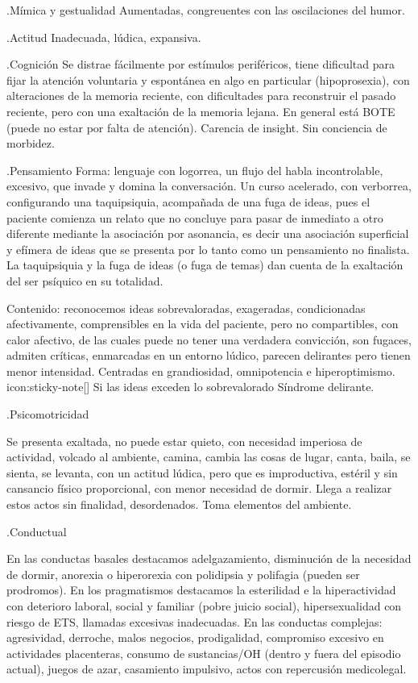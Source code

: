 .Mímica y gestualidad
Aumentadas, congreuentes con las oscilaciones del humor.

.Actitud
Inadecuada, lúdica, expansiva.

.Cognición
Se distrae fácilmente por estímulos periféricos, tiene dificultad para fijar la atención voluntaria y espontánea en algo en particular (hipoprosexia), con alteraciones de la memoria reciente, con dificultades para reconstruir el pasado reciente, pero con una exaltación de la memoria lejana. En general está BOTE (puede no estar por falta de atención). Carencia de insight. Sin conciencia de morbidez.

.Pensamiento
Forma: lenguaje con logorrea, un flujo del habla incontrolable, excesivo, que invade y domina la conversación. Un curso acelerado, con verborrea, configurando una taquipsiquia, acompañada de una fuga de ideas, pues el paciente comienza un relato que no concluye para pasar de inmediato a otro diferente mediante la asociación por asonancia, es decir una asociación superficial y efímera de ideas que se presenta por lo tanto como un pensamiento no finalista. La taquipsiquia y la fuga de ideas (o fuga de temas) dan cuenta de la exaltación del ser psíquico en su totalidad.

Contenido: reconocemos ideas sobrevaloradas, exageradas, condicionadas afectivamente, comprensibles en la vida del paciente, pero no compartibles, con calor afectivo, de las cuales puede no tener una verdadera convicción, son fugaces, admiten críticas, enmarcadas en un entorno lúdico, parecen delirantes pero tienen menor intensidad. Centradas en grandiosidad, omnipotencia e hiperoptimismo. icon:sticky-note[] Si las ideas exceden lo sobrevalorado \faArrowCircleRight Síndrome delirante.

.Psicomotricidad

Se presenta exaltada, no puede estar quieto, con necesidad imperiosa de actividad, volcado al ambiente, camina, cambia las cosas de lugar, canta, baila, se sienta, se levanta, con un actitud lúdica, pero que es improductiva, estéril y sin cansancio físico proporcional, con menor necesidad de dormir. Llega a realizar estos actos sin finalidad, desordenados. Toma elementos del ambiente.

.Conductual

En las conductas basales destacamos adelgazamiento, disminución de la necesidad de dormir, anorexia o hiperorexia con polidipsia y polifagia (pueden ser prodromos). En los pragmatismos destacamos la esterilidad e la hiperactividad con deterioro laboral, social y familiar (pobre juicio social), hipersexualidad con riesgo de ETS, llamadas excesivas inadecuadas. En las conductas complejas: agresividad, derroche, malos negocios, prodigalidad, compromiso excesivo en actividades placenteras, consumo de sustancias/OH (dentro y fuera del episodio actual), juegos de azar, casamiento impulsivo, actos con repercusión medicolegal.

